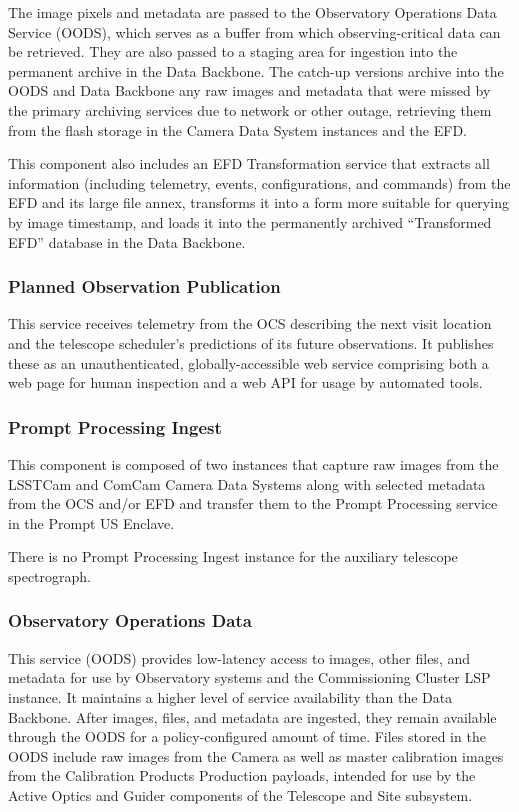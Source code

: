 \documentclass[DM,toc,lsstdraft]{lsstdoc}
\begin{document}
The image pixels and metadata are passed to the Observatory Operations Data Service (OODS), which serves as a buffer from which observing-critical data can be retrieved.
They are also passed to a staging area for ingestion into the permanent archive in the Data Backbone.
The catch-up versions archive into the OODS and Data Backbone any raw
images and metadata that were missed by the primary archiving services
due to network or other outage, retrieving them from the flash storage
in the Camera Data System instances and the EFD.

This component also includes an EFD Transformation service that extracts
all information (including telemetry, events, configurations, and
commands) from the EFD and its large file annex, transforms it into a
form more suitable for querying by image timestamp, and loads it into
the permanently archived ``Transformed EFD'' database in the Data
Backbone.

\subsubsection{Planned Observation Publication}\label{planned-observation-publication}

This service receives telemetry from the OCS describing the next visit location and the telescope scheduler's predictions of its future observations.
It publishes these as an unauthenticated, globally-accessible web service comprising both a web page for human inspection and a web API for usage by automated tools.

\subsubsection{Prompt Processing Ingest}\label{prompt-processing-ingest}

This component is composed of two instances that capture
raw images from the LSSTCam and ComCam Camera Data
Systems along with selected metadata from the OCS and/or EFD and
transfer them to the Prompt Processing service in the Prompt US Enclave.

There is no Prompt Processing Ingest instance for the auxiliary
telescope spectrograph.

\subsubsection{Observatory Operations Data}\label{obs-ops-data}

This service (OODS) provides low-latency access to images, other files, and metadata for use by Observatory systems and the Commissioning Cluster LSP instance.
It maintains a higher level of service availability than the Data Backbone.
After images, files, and metadata are ingested, they remain available through the OODS for a policy-configured amount of time.
Files stored in the OODS include raw images from the Camera as well as master calibration images from the Calibration Products Production payloads, intended for use by the Active Optics and Guider components of the Telescope and Site subsystem.
\end{document}

